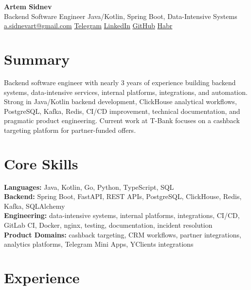 \documentclass[10pt,a4paper]{article}
\begin{document}
\small

\begin{center}
{\LARGE \textbf{Artem Sidnev}}\\[0.18em]
{\normalsize Backend Software Engineer \textbar{} Java/Kotlin, Spring Boot, Data-Intensive Systems}\\[0.32em]
{\footnotesize
\href{mailto:a.sidnevart@gmail.com}{a.sidnevart@gmail.com}
\enspace\textbar\enspace
\href{https://t.me/sidnevart}{Telegram}
\enspace\textbar\enspace
\href{https://www.linkedin.com/in/artem-sidnev}{LinkedIn}
\enspace\textbar\enspace
\href{https://github.com/sidnevart}{GitHub}
\enspace\textbar\enspace
\href{https://habr.com/ru/users/sidnevart/}{Habr}
}
\end{center}

\section*{Summary}
Backend software engineer with nearly 3 years of experience building backend systems, data-intensive services, internal platforms, integrations, and automation. Strong in Java/Kotlin backend development, ClickHouse analytical workflows, PostgreSQL, Kafka, Redis, CI/CD improvement, technical documentation, and pragmatic product engineering. Current work at T-Bank focuses on a cashback targeting platform for partner-funded offers.

\section*{Core Skills}
\textbf{Languages:} Java, Kotlin, Go, Python, TypeScript, SQL \\
\textbf{Backend:} Spring Boot, FastAPI, REST APIs, PostgreSQL, ClickHouse, Redis, Kafka, SQLAlchemy \\
\textbf{Engineering:} data-intensive systems, internal platforms, integrations, CI/CD, GitLab CI, Docker, nginx, testing, documentation, incident resolution \\
\textbf{Product Domains:} cashback targeting, CRM workflows, partner integrations, analytics platforms, Telegram Mini Apps, YClients integrations

\section*{Experience}
\end{document}
